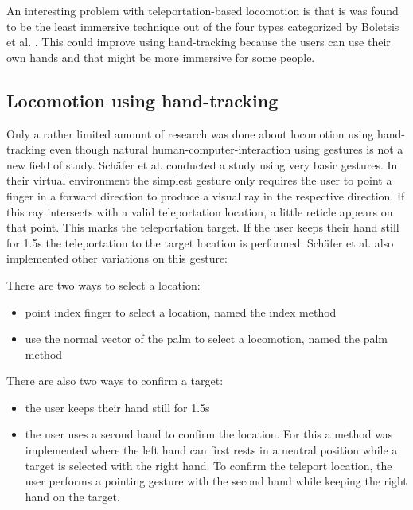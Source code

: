An interesting problem with teleportation-based locomotion is that is
was found to be the least immersive technique out of the four types
categorized by Boletsis et al. \cite{Boletsis}. This
could improve using hand-tracking because the users can use their own
hands and that might be more immersive for some people. %


\subsection{Locomotion using hand-tracking}\label{locomotion-using-hand-tracking}

Only a rather limited amount of research was done about locomotion using hand-tracking even though natural human-computer-interaction using gestures is not a new field of study. Schäfer et al. \cite{Schafer2021} conducted a study using very basic gestures. In their virtual environment the simplest gesture only requires the user to point a finger in a forward direction to produce a visual ray in the respective direction. If this ray intersects with a valid teleportation location, a little reticle appears on that point. This marks the teleportation target. If the user keeps their hand still for 1.5s the teleportation to the target location is performed. Schäfer et al. also implemented other variations on this gesture:

There are two ways to select a location:
\begin{itemize}
  \item point index finger to select a location, named the index method
  \item use the normal vector of the palm to select a locomotion, named the palm method
\end{itemize}

There are also two ways to confirm a target:
\begin{itemize}
  \item the user keeps their hand still for 1.5s
  \item the user uses a second hand to confirm the location. For this a method was implemented where the left hand can first rests in a neutral position while a target is selected with the right hand. To confirm the teleport location, the user performs a pointing gesture with the second hand while keeping the right hand on the target.
\end{itemize}

